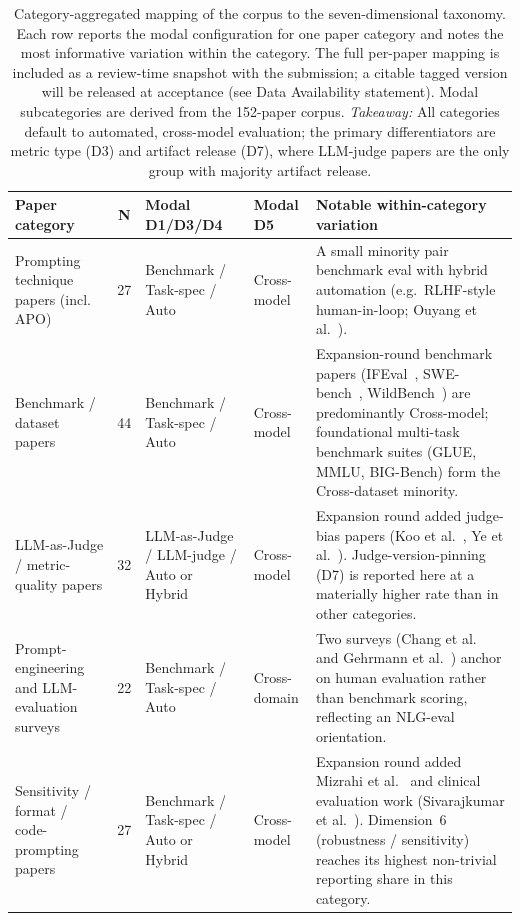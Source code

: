 \documentclass[acmsmall, nonacm, screen]{acmart}
\begin{document}
\begin{table}[!htbp]
\renewcommand{\arraystretch}{1.05}
\caption{Category-aggregated mapping of the corpus to the
seven-dimensional taxonomy. Each row reports the modal configuration
for one paper category and notes the most informative variation
within the category. The full per-paper mapping is included as a review-time snapshot
with the submission; a citable tagged version will be released at
acceptance (see Data Availability statement).
Modal subcategories are derived from the 152-paper corpus.
\textit{Takeaway:} All categories default to automated, cross-model evaluation; the primary differentiators are metric type (D3) and artifact release (D7), where LLM-judge papers are the only group with majority artifact release.}
\label{tab:comparison}
\centering
\footnotesize
\setlength{\tabcolsep}{4pt}
\begin{tabular}{p{2.6cm} c p{2.8cm} p{1.6cm} p{4.3cm}}
\toprule
\textbf{Paper category} & \textbf{N} &
\textbf{Modal D1/D3/D4} &
\textbf{Modal D5} &
\textbf{Notable within-category variation} \\
\midrule
Prompting technique papers (incl. APO) & 27 &
Benchmark / Task-spec / Auto &
Cross-model &
A small minority pair benchmark eval with hybrid automation
(e.g.\ RLHF-style human-in-loop;
Ouyang et al.~\cite{ouyang2022training}). \\
\midrule
Benchmark / dataset papers & 44 &
Benchmark / Task-spec / Auto &
Cross-model &
Expansion-round benchmark papers (IFEval~\cite{zhou2023instruction},
SWE-bench~\cite{jimenez2023swebench}, WildBench~\cite{wildbench2024})
are predominantly Cross-model; foundational multi-task benchmark suites
(GLUE, MMLU, BIG-Bench) form the Cross-dataset minority. \\
\midrule
LLM-as-Judge / metric-quality papers & 32 &
LLM-as-Judge / LLM-judge / Auto or Hybrid &
Cross-model &
Expansion round added judge-bias papers (Koo et al.~\cite{koo2023benchmarking},
Ye et al.~\cite{ye2024justice}). Judge-version-pinning (D7) is
reported here at a materially higher rate than in other categories. \\
\midrule
Prompt-engineering and LLM-evaluation surveys & 22 &
Benchmark / Task-spec / Auto &
Cross-domain &
Two surveys (Chang et al.~\cite{chang2023survey} and
Gehrmann et al.~\cite{repairing2022}) anchor on human evaluation
rather than benchmark scoring, reflecting an NLG-eval orientation. \\
\midrule
Sensitivity / format / code-prompting papers & 27 &
Benchmark / Task-spec / Auto or Hybrid &
Cross-model &
Expansion round added Mizrahi et al.~\cite{mizrahi2024state} and
clinical evaluation work (Sivarajkumar et al.~\cite{sivarajkumar2024empirical}).
Dimension~6 (robustness / sensitivity) reaches its highest
non-trivial reporting share in this category. \\
\bottomrule
\end{tabular}
\end{table}
\end{document}
